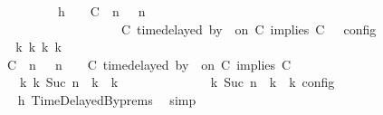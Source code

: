 \begin{isabellebody}
\ \ \ \ \ \ \isamarkupfalse%
\ {\isacharminus}\isanewline
\ \ \ \ \ \ \ \ \isamarkupfalse%
\ h{}{\isacharcolon}\ {\isacartoucheopen}{\isasymrho}\ {\isasymin}\ {\isasymlbrakk}\ {\isacharparenleft}{\isacharparenleft}C\ {\isasymnot}{\isasymUp}\ n{\isacharparenright}\ {\isacharhash}\ {\isasymGamma}{\isacharparenright}{\isacharcomma}\ n\isanewline
\ \ \ \ \ \ \ \ \ \ \ \ \ \ \ \ \ \ \ \ \ \ \ \ \ {\isasymturnstile}\ {\isasymPsi}\ {\isasymtriangleright}\ {\isacharparenleft}{\isacharparenleft}C\ time{\isacharminus}delayed\ by\ {\isasymdelta}{\isasymtau}\ on\ C\ implies\ C\ {\isacharhash}\ {\isasymPhi}{\isacharparenright}\ {\isasymrbrakk}\isactrlsub c\isactrlsub o\isactrlsub n\isactrlsub f\isactrlsub i\isactrlsub g{\isacartoucheclose}\isanewline
\ \ \ \ \ \ \ \ \isamarkupfalse%
\ \isamarkupfalse%
\ {\isacartoucheopen}{\isasymexists}{\isasymGamma}\isactrlsub k\ {\isasymPsi}\isactrlsub k\ {\isasymPhi}\isactrlsub k\ k{\isachardot}\isanewline
\ \ \ \ \ \ \ \ \ \ {\isacharparenleft}{\isacharparenleft}{\isacharparenleft}{\isacharparenleft}C\ {\isasymnot}{\isasymUp}\ n{\isacharparenright}\ {\isacharhash}\ {\isasymGamma}{\isacharparenright}{\isacharcomma}\ n\ {\isasymturnstile}\ {\isasymPsi}\ {\isasymtriangleright}\ {\isacharparenleft}{\isacharparenleft}C\ time{\isacharminus}delayed\ by\ {\isasymdelta}{\isasymtau}\ on\ C\ implies\ C\ {\isacharhash}\ {\isasymPhi}{\isacharparenright}{\isacharparenright}\isanewline
\ \ \ \ \ \ \ \ \ \ \ \ {\isasymhookrightarrow}\isactrlbsup k\isactrlesup \ {\isacharparenleft}{\isasymGamma}\isactrlsub k{\isacharcomma}\ Suc\ n\ {\isasymturnstile}\ {\isasymPsi}\isactrlsub k\ {\isasymtriangleright}\ {\isasymPhi}\isactrlsub k{\isacharparenright}{\isacharparenright}\isanewline
\ \ \ \ \ \ \ \ \ \ {\isasymand}\ {\isasymrho}\ {\isasymin}\ {\isasymlbrakk}\ {\isasymGamma}\isactrlsub k{\isacharcomma}\ Suc\ n\ {\isasymturnstile}\ {\isasymPsi}\isactrlsub k\ {\isasymtriangleright}\ {\isasymPhi}\isactrlsub k\ {\isasymrbrakk}\isactrlsub c\isactrlsub o\isactrlsub n\isactrlsub f\isactrlsub i\isactrlsub g{\isacartoucheclose}\isanewline
\ \ \ \ \ \ \ \ \ \ \isamarkupfalse%
\ h{}\ TimeDelayedBy{\isachardot}prems\ \isamarkupfalse%
\ simp\isanewline
\ \ \ \ \ \ \ \ \isamarkupfalse%

\end{isabellebody}
